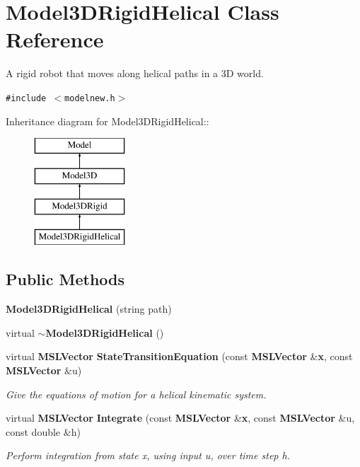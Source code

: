 \section{Model3DRigid\-Helical  Class Reference}
\label{classModel3DRigidHelical}
A rigid robot that moves along helical paths in a 3D world. 


{\tt \#include $<$modelnew.h$>$}

Inheritance diagram for Model3DRigid\-Helical::\begin{figure}[H]
\begin{center}
\leavevmode
\includegraphics[height=4cm]{classModel3DRigidHelical}
\end{center}
\end{figure}
\subsection*{Public Methods}
\begin{CompactItemize}
\item 
{\bf Model3DRigid\-Helical} (string path)
\item 
virtual {\bf $\sim$Model3DRigid\-Helical} ()
\item 
virtual {\bf MSLVector} {\bf State\-Transition\-Equation} (const {\bf MSLVector} \&{\bf x}, const {\bf MSLVector} \&u)
\begin{CompactList}\small\item\em Give the equations of motion for a helical kinematic system.\item\end{CompactList}\item 
virtual {\bf MSLVector} {\bf Integrate} (const {\bf MSLVector} \&{\bf x}, const {\bf MSLVector} \&u, const double \&h)
\begin{CompactList}\small\item\em Perform integration from state x, using input u, over time step h.\item\end{CompactList}\end{CompactItemize}


